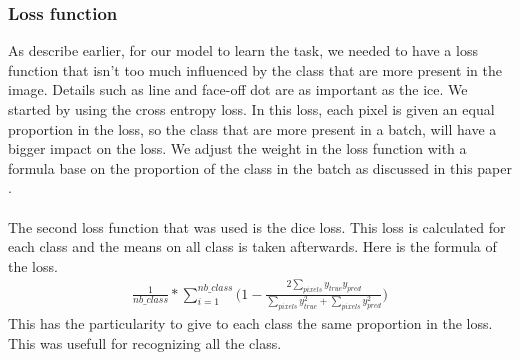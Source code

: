 \subsubsection{Loss function}
As describe earlier, for our model to learn the task, we needed to have a loss function that isn't too much influenced by the class that are more present in the image. Details such as line and face-off dot are as important as the ice. We started by using the cross entropy loss. In this loss, each pixel is given an equal proportion in the loss, so the class that are more present in a batch, will have a bigger impact on the loss. We adjust the weight in the loss function with a formula base on the proportion of the class in the batch as discussed in this paper \cite{Paszke}. \\
\\
The second loss function that was used is the dice loss. This loss is calculated for each class and the means on all class is taken afterwards. Here is the formula of the loss.
\begin{gather*}
 \frac{1}{nb\_class}*\sum\limits_{i=1}^{nb\_class}\Big(1-\frac{2\sum\limits_{pixels}y_{true}y_{pred}}{\sum\limits_{pixels}y_{true}^{2}+\sum\limits_{pixels}y_{pred}^{2}}\Big)
\end{gather*}
This has the particularity to give to each class the same proportion in the loss. This was usefull for recognizing all the class.

